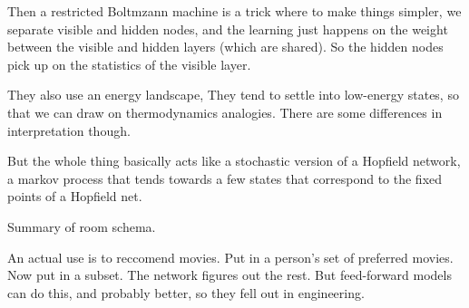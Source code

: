 Then a restricted Boltmzann machine is a trick where to make things simpler, we separate visible and hidden nodes, and the learning just happens on the weight between the visible and hidden layers (which are shared).  So the hidden nodes pick up on the statistics of the visible layer.

They also use an energy landscape, They tend to settle into low-energy states, so that we can draw on thermodynamics analogies. There are some differences in interpretation though.

But the whole thing basically acts like a stochastic version of a Hopfield network, a markov process that tends towards a few states that correspond to the fixed points of a Hopfield net.

Summary of room schema.

An actual use is to reccomend movies. Put in a person's set of preferred movies. Now put in a subset. The network figures out the rest. But feed-forward models can do this, and probably better, so they fell out in engineering.